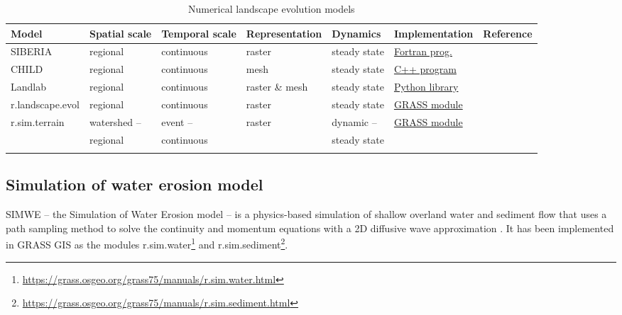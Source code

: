 \documentclass[final,3p,times,twocolumn]{elsarticle}
\begin{document}
\begin{table}
\small
\caption{Numerical landscape evolution models}
\begin{tabu} to \textwidth {XXXXXXl}
\toprule
Model & Spatial scale &  Temporal scale & Representation & Dynamics & Implementation & Reference\\
\midrule
SIBERIA & regional & continuous & raster & steady state & \href{https://csdms.colorado.edu/wiki/Model:SIBERIA}{Fortran prog.} & \cite{Willgoose2005}\\
CHILD & regional & continuous & mesh & steady state & \href{https://csdms.colorado.edu/wiki/Model:CHILD}{C++ program} & \cite{Tucker2001}\\
Landlab & regional & continuous & raster \& mesh & steady state & \href{https://github.com/landlab/}{Python library} & \cite{Hobley2017}\\
r.landscape.evol  & regional & continuous & raster &  steady state & \href{https://grass.osgeo.org/grass74/manuals/addons/r.landscape.evol.html}{GRASS module} & \cite{Barton2010}\\
r.sim.terrain & watershed -- & event -- & raster & dynamic -- & \href{https://github.com/baharmon/landscape_evolution}{GRASS module} &\\ %
& regional & continuous && steady state & &\\
\bottomrule
\\
\end{tabu}
\label{table:evolution_models} 
\end{table}


\subsection{Simulation of water erosion model} \label{simwe}
SIMWE -- the Simulation of Water Erosion model -- 
is a physics-based simulation of shallow overland water and sediment flow
that uses a path sampling method to solve the continuity and momentum equations 
with a 2D diffusive wave approximation 
\cite{Mitas1998,Mitasova2001,Mitasova2004}.
It has been implemented in GRASS GIS as the modules 
r.sim.water\footnote{\url{https://grass.osgeo.org/grass75/manuals/r.sim.water.html}} 
and r.sim.sediment\footnote{\url{https://grass.osgeo.org/grass75/manuals/r.sim.sediment.html}}.
\end{document}
